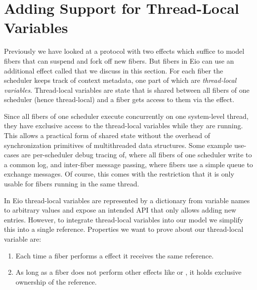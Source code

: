 \section{Adding Support for Thread-Local Variables}
\label{sec:thread-local-vars}


Previously we have looked at a protocol with two effects which suffice to model fibers that can suspend and fork off new fibers.
But fibers in Eio can use an additional effect called \egetctx{} that we discuss in this section.
For each fiber the scheduler keeps track of context metadata, one part of which are \emph{thread-local variables}.
Thread-local variables are state that is shared between all fibers of one scheduler (hence thread-local) and a fiber gets access to them via the \egetctx{} effect.


Since all fibers of one scheduler execute concurrently on one system-level thread, they have exclusive access to the thread-local variables while they are running.
This allows a practical form of shared state without the overhead of synchronization primitives of multithreaded data structures.
Some example use-cases are per-scheduler debug tracing of, where all fibers of one scheduler write to a common log,
and inter-fiber message passing, where fibers use a simple queue to exchange messages.
Of course, this comes with the restriction that it is only usable for fibers running in the same thread.


In Eio thread-local variables are represented by a dictionary from variable names to arbitrary values and expose an intended API that only allows adding new entries.
However, to integrate thread-local variables into our model we simplify this into a single reference.
Properties we want to prove about our thread-local variable are:
\begin{enumerate}
    \item Each time a fiber performs a \egetctx{} effect it receives the same reference.
    \item As long as a fiber does not perform other effects like \efork{} or \esuspend{}, it holds exclusive ownership of the reference.
\end{enumerate}

